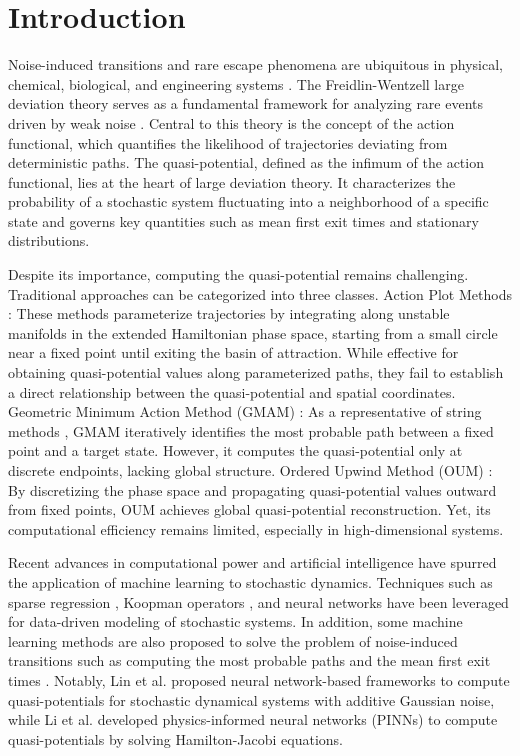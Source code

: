 \documentclass[11pt]{article}
\theoremstyle{plain}      %
\theoremstyle{definition} %
\begin{document}
\section{Introduction}
\label{intro}
Noise-induced transitions and rare escape phenomena are ubiquitous in physical, chemical, biological, and engineering systems \cite{horsthemke1984noise, zhu2003first}. The Freidlin-Wentzell large deviation theory serves as a fundamental framework for analyzing rare events driven by weak noise \cite{Freidlin2012, 10.1214/07-AOP362, dean2009splitting, huisinga2003extracting, lu2017gaussian}. Central to this theory is the concept of the action functional, which quantifies the likelihood of trajectories deviating from deterministic paths. The quasi-potential, defined as the infimum of the action functional, lies at the heart of large deviation theory. It characterizes the probability of a stochastic system fluctuating into a neighborhood of a specific state and governs key quantities such as mean first exit times and stationary distributions.

Despite its importance, computing the quasi-potential remains challenging. Traditional approaches can be categorized into three classes. Action Plot Methods \cite{beri2005solution}: These methods parameterize trajectories by integrating along unstable manifolds in the extended Hamiltonian phase space, starting from a small circle near a fixed point until exiting the basin of attraction. While effective for obtaining quasi-potential values along parameterized paths, they fail to establish a direct relationship between the quasi-potential and spatial coordinates. Geometric Minimum Action Method (GMAM) \cite{heymann2008geometric}: As a representative of string methods \cite{grafke2019numerical, zhou2008adaptive, cameron2011string, weinan2004minimum}, GMAM iteratively identifies the most probable path between a fixed point and a target state. However, it computes the quasi-potential only at discrete endpoints, lacking global structure. Ordered Upwind Method (OUM) \cite{cameron2012finding, dahiya2018ordered}: By discretizing the phase space and propagating quasi-potential values outward from fixed points, OUM achieves global quasi-potential reconstruction. Yet, its computational efficiency remains limited, especially in high-dimensional systems.

Recent advances in computational power and artificial intelligence have spurred the application of machine learning to stochastic dynamics. Techniques such as sparse regression \cite{Boninsegna2018, YangLi2020a}, Koopman operators \cite{EDMD, SKO3}, and neural networks \cite{XiaoliChen} have been leveraged for data-driven modeling of stochastic systems. In addition, some machine learning methods are also proposed to solve the problem of noise-induced transitions such as computing the most probable paths \cite{li2021machine, wei2022optimal} and the mean first exit times \cite{li2024deep}. Notably, Lin et al. \cite{lin2022data} proposed neural network-based frameworks to compute quasi-potentials for stochastic dynamical systems with additive Gaussian noise, while Li et al. \cite{li2022machine} developed physics-informed neural networks (PINNs) to compute quasi-potentials by solving Hamilton-Jacobi equations.
\end{document}
